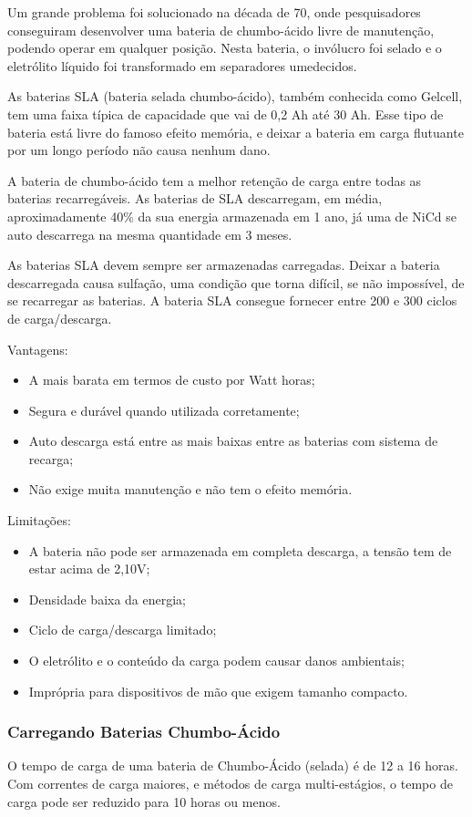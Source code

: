 Um grande problema foi solucionado na década de 70, onde pesquisadores conseguiram desenvolver uma bateria de chumbo-ácido livre de manutenção, podendo operar em qualquer posição. Nesta bateria, o invólucro foi selado e o eletrólito líquido foi transformado em separadores umedecidos.

As baterias SLA (bateria selada chumbo-ácido), também conhecida como Gelcell, tem uma faixa típica de capacidade que vai de 0,2 Ah até 30 Ah. Esse tipo de bateria está livre do famoso efeito memória, e deixar a bateria em carga flutuante por um longo período não causa nenhum dano.

A bateria de chumbo-ácido tem a melhor retenção de carga entre todas as baterias recarregáveis. As baterias de SLA descarregam, em média, aproximadamente 40\% da sua energia armazenada em 1 ano, já uma de NiCd se auto descarrega na mesma quantidade em 3 meses.

As baterias SLA devem sempre ser armazenadas carregadas. Deixar a bateria descarregada causa sulfação, uma condição que torna difícil, se não impossível, de se recarregar as baterias. A bateria SLA consegue fornecer entre 200 e 300 ciclos de carga/descarga.

Vantagens:
\begin{itemize}
 \item A mais barata em termos de custo por Watt horas;
 \item Segura e durável quando utilizada corretamente;
 \item Auto descarga está entre as mais baixas entre as baterias com sistema de recarga;
 \item Não exige muita manutenção e não tem o efeito memória.
\end{itemize}

Limitações:
\begin{itemize}
 \item A bateria não pode ser armazenada em completa descarga, a tensão tem de estar acima de 2,10V;
 \item Densidade baixa da energia;
 \item Ciclo de carga/descarga limitado;
 \item O eletrólito e o conteúdo da carga podem causar danos ambientais;
 \item Imprópria para dispositivos de mão que exigem tamanho compacto.
\end{itemize}

\subsubsection{Carregando Baterias Chumbo-Ácido}
O tempo de carga de uma bateria de Chumbo-Ácido (selada) é de 12 a 16 horas. Com correntes de carga maiores, e métodos de carga multi-estágios, o tempo de carga pode ser reduzido para 10 horas ou menos.

